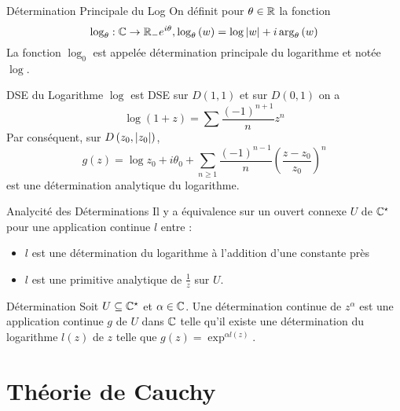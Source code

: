 \documentclass{cours}
\begin{document}
\begin{définition}{Détermination Principale du Log}{}
    On définit pour $\theta \in \mathbb{R}$ la fonction
    \begin{equation*}
        \log_{\theta} : \mathbb{C} \to \mathbb{R}_{-}e^{i\theta}, \log_{\theta}\left(w\right)=\log \left|w\right| + i\arg_{\theta}\left(w\right)
    \end{equation*}
    La fonction $\log_{0}$ est appelée détermination principale du logarithme et notée $\log$. 
\end{définition}

\begin{propositionfr}{DSE du Logarithme}{}
    $\log$ est DSE sur $D\left(1, 1\right)$ et sur $D\left(0, 1\right)$ on a
    \begin{equation*}
        \log\left(1 + z\right) = \sum \frac{\left(-1\right)^{n + 1}}{n}z^{n}
    \end{equation*}
    Par conséquent, sur $D\left(z_{0}, \left|z_{0}\right|\right)$, 
    \begin{equation*}
        g\left(z\right) = \log z_{0} + i\theta_{0} + \sum_{n \geq 1}\frac{\left(-1\right)^{n - 1}}{n}\left(\frac{z - z_{0}}{z_{0}}\right)^{n}
    \end{equation*}
    est une détermination analytique du logarithme. 
\end{propositionfr}

\begin{propositionfr}{Analycité des Déterminations}{}
    Il y a équivalence sur un ouvert connexe $U$ de $\mathbb{C}^{\star}$ pour une application continue $l$ entre : 
    \begin{itemize}
        \item $l$ est une détermination du logarithme à l'addition d'une constante près
        \item $l$ est une primitive analytique de $\frac{1}{z}$ sur $U$. 
    \end{itemize}
\end{propositionfr}

\begin{définition}{Détermination}{}
    Soit $U \subseteq \mathbb{C}^{\star}$ et $\alpha \in \mathbb{C}$. Une détermination continue de $z^{\alpha}$ est une application continue $g$ de $U$ dans $\mathbb{C}$ telle qu'il existe une détermination du logarithme $l\left(z\right)$ de $z$ telle que $g\left(z\right) = \exp^{\alpha l\left(z\right)}$.
\end{définition}

\section{Théorie de Cauchy}
\end{document}
